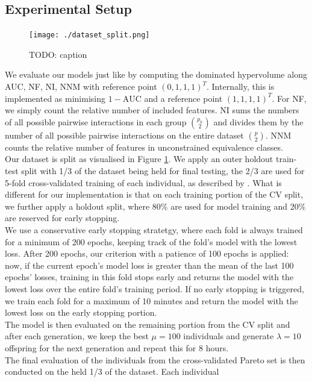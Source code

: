 \documentclass[twoside,11pt]{article}
\begin{document}
\subsection{Experimental Setup}
\begin{figure}
  \centering
  \texttt{[image: ./dataset\_split.png]}
  \caption{TODO: caption}
  \label{fig-dataset-split}
\end{figure}
We evaluate our models just like \citet[pp. 543f]{EAGGA} by computing the dominated hypervolume along AUC, NF, NI, NNM with reference point $(0, 1, 1, 1)^T$.
Internally, this is implemented as minimising $1-\text{AUC}$ and a reference point $(1, 1, 1, 1)^T$.
For NF, we simply count the relative number of included features.
NI sums the numbers of all possible pairwise interactions in each group ${p_k \choose 2}$ and divides them by the number of all possible pairwise interactions
on the entire dataset ${p \choose 2}$.
NNM counts the relative number of features in unconstrained equivalence classes.
\\
Our dataset is split as visualised in Figure \ref{fig-dataset-split}.
We apply an outer holdout train-test split with 1/3 of the dataset being held for final testing, the 2/3 are used for 5-fold cross-validated training of each individual,
as described by \citet[p. 543]{EAGGA}.
What is different for our implementation is that on each training portion of the CV split, we further apply a holdout split, where 80\% are used for model training and
20\% are reserved for early stopping.
\\
We use a conservative early stopping stratetgy, where each fold is always trained for a minimum of 200 epochs, keeping track of the fold's model with the lowest loss.
After 200 epochs, our criterion with a patience of 100 epochs is applied: now, if the current epoch's model loss is greater than the mean of the last 100 epochs'
losses, training in this fold stops early and returns the model with the lowest loss over the entire fold's training period.
If no early stopping is triggered, we train each fold for a maximum of 10 minutes and return the model with the lowest loss on the early stopping portion.
\\
The model is then evaluated on the remaining portion from the CV split and after each generation, we keep the best $\mu=100$ individuals and generate $\lambda=10$
offspring for the next generation and repeat this for 8 hours.
\\
The final evaluation of the individuals from the cross-validated Pareto set is then conducted on the held 1/3 of the dataset. Each individual
\end{document}
